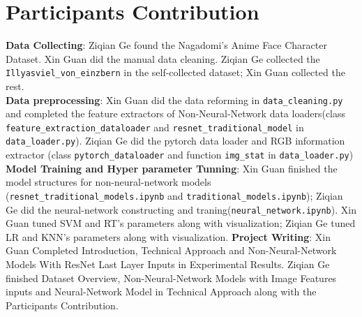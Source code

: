 \documentclass[11.5pt]{article}
\begin{document}
    \section{Participants Contribution}
    \textbf{Data Collecting}: Ziqian Ge found the Nagadomi's Anime Face Character Dataset. Xin Guan did the manual data cleaning. Ziqian Ge collected the \texttt{Illyasviel\_von\_einzbern} in the self-collected dataset; Xin Guan collected the rest. \\
    \textbf{Data preprocessing}: Xin Guan did the data reforming in \texttt{data\_cleaning.py} and completed the feature extractors of Non-Neural-Network data loaders(class \texttt{feature\_extraction\_dataloader} and \texttt{resnet\_traditional\_model} in \texttt{data\_loader.py}). Ziqian Ge did the pytorch data loader and RGB information extractor (class \texttt{pytorch\_dataloader} and function \texttt{img\_stat} in \texttt{data\_loader.py}) 
    \vspace{10mm}
    \textbf{Model Training and Hyper parameter Tunning}: Xin Guan finished the model structures for non-neural-network models (\texttt{resnet\_traditional\_models.ipynb} and \texttt{traditional\_models.ipynb}); Ziqian Ge did the neural-network constructing and traning(\texttt{neural\_network.ipynb}). Xin Guan tuned SVM and RT's parameters along with visualization; Ziqian Ge tuned LR and KNN's parameters along with visualization.
    \textbf{Project Writing}: Xin Guan Completed Introduction, Technical Approach and Non-Neural-Network Models With ResNet Last Layer Inputs in Experimental Results. Ziqian Ge finished Dataset Overview, Non-Neural-Network Models with Image Features inputs and Neural-Network Model in Technical Approach along with the Participants Contribution.
    \vspace{10mm}


    \newpage
    
    {}
    

    
\end{document}
